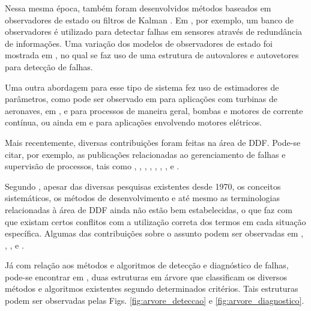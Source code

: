 
Nessa mesma época, também foram desenvolvidos métodos baseados em observadores
de estado ou filtros de Kalman \cite{beard:1971,mehra:1971,jones:1973}. Em
, por exemplo, um banco de observadores é utilizado para
detectar falhas em sensores através de redundância de informações. Uma variação
dos modelos de observadores de estado foi mostrada em ,
no qual se faz uso de uma estrutura de autovalores e autovetores para detecção
de falhas.

Uma outra abordagem para esse tipo de sistema fez uso de estimadores de
parâmetros, como pode ser observado em  para
aplicações com turbinas de aeronaves, em ,
 e  para processos de
maneira geral, bombas e motores de corrente contínua, ou ainda em
 e  para aplicações envolvendo
motores elétricos.

Mais recentemente, diversas contribuições foram feitas na área de DDF. Pode-se
citar, por exemplo, as publicações relacionadas ao gerenciamento de falhas e
supervisão de processos, tais como ,
, , ,
, , ,
 e .

Segundo , apesar das diversas pesquisas existentes desde
1970, os conceitos sistemáticos, os métodos de desenvolvimento e até mesmo as
terminologias relacionadas à área de DDF ainda não estão bem estabelecidas, o
que faz com que existam certos conflitos com a utilização correta dos termos em
cada situação específica. Algumas das contribuições sobre o assunto podem ser
observadas em , ,
,  e .

Já com relação aos métodos e algoritmos de detecção e diagnóstico de falhas,
pode-se encontrar em , duas estruturas em árvore que
classificam os diversos métodos e al\-go\-rit\-mos existentes segundo
determinados critérios. Tais estruturas podem ser observadas pelas Figs.
\ref{fig:arvore_deteccao} e \ref{fig:arvore_diagnostico}.


